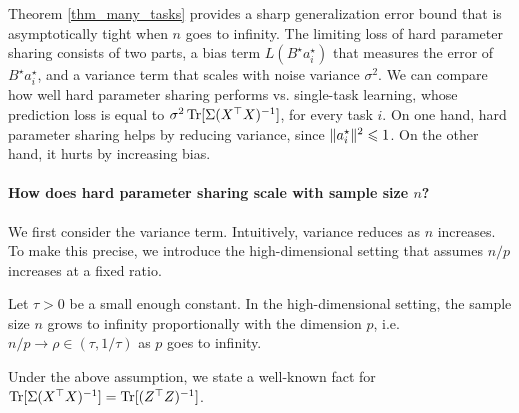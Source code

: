 Theorem \ref{thm_many_tasks} provides a sharp generalization error bound that is asymptotically tight when $n$ goes to infinity.
The limiting loss of hard parameter sharing consists of two parts, a bias term $L(B^{\star} a_i^{\star})$ that measures the error of $B^{\star} a_i^{\star}$, and a variance term that scales with noise variance $\sigma^2$.
We can compare how well hard parameter sharing performs vs. single-task learning, whose prediction loss is equal to $\sigma^2 \operatorname{Tr}[\Sigma (X^{\top} X)^{-1}]$, for every task $i$.
On one hand, hard parameter sharing helps by reducing variance, since $\|a_i^{\star}\|^2 \leqslant 1$.
On the other hand, it hurts by increasing bias.


\paragraph{How does hard parameter sharing scale with sample size $n$?}
We first consider the variance term.
Intuitively, variance reduces as $n$ increases.
To make this precise, we introduce the high-dimensional setting that assumes $n / p$ increases at a fixed ratio.
\begin{assumption}\label{assume_rm}
	Let $\tau > 0$ be a small enough constant.
	In the high-dimensional setting,
  the sample size $n$ grows to infinity proportionally with the dimension $p$, i.e. $n / p \rightarrow \rho \in (\tau, 1/\tau)$ as $p$ goes to infinity.
\end{assumption}
Under the above assumption, we state a well-known fact for $\operatorname{Tr}[\Sigma (X^{\top} X)^{-1}] = \operatorname{Tr}[(Z^{\top} Z)^{-1}]$.

